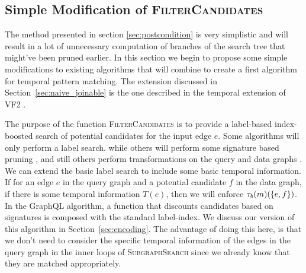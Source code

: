 \subsection{Simple Modification of \textsc{FilterCandidates}}
\label{sec:naive_filter_candidates}

The method presented in section \ref{sec:postcondition} is very simplistic and
will result in a lot of unnecessary computation of branches of the search tree
that might've been pruned earlier. In this section we begin to propose some
simple modifications to existing algorithms that will combine to create a first
algorithm for temporal pattern matching. The extension discussed in
Section~\ref{sec:naive_joinable} is the one described in the temporal extension
of VF2 \cite{2016-arXiv-TemporalIso}.

The purpose of the function \textsc{FilterCandidates} is to provide a
label-based index-boosted search of potential candidates for the input edge
$e$. Some algorithms \cite{1976-ACMJ-Ullman, 2009-EDBT-GADDI, 2008-VLDB-QuickSI}
will only perform a label search. while others will perform some signature based
pruning \cite{2010-VLDB-SPath,2008-SIGMOD-GraphQL}, and still others perform
transformations on the query and data graphs \cite{2013-SIGMOD-TurboISO,
  2015-VLDB-BoostIso}. We can extend the basic label search to include some
basic temporal information. If for an edge $e$ in the query graph and a
potential candidate $f$ in the data graph, if there is some temporal information
$T(e)$, then we will enforce $\tau_b(m)(\{e, f\})$. In the GraphQL
algorithm, a function that discounts candidates based on signatures is composed
with the standard label-index. We discuss our version of this algorithm in
Section~\ref{sec:encoding}. The advantage of doing this here, is that we don't
need to consider the specific temporal information of the edges in the query
graph in the inner loops of \textsc{SubgraphSearch} since we already know that
they are matched appropriately.

